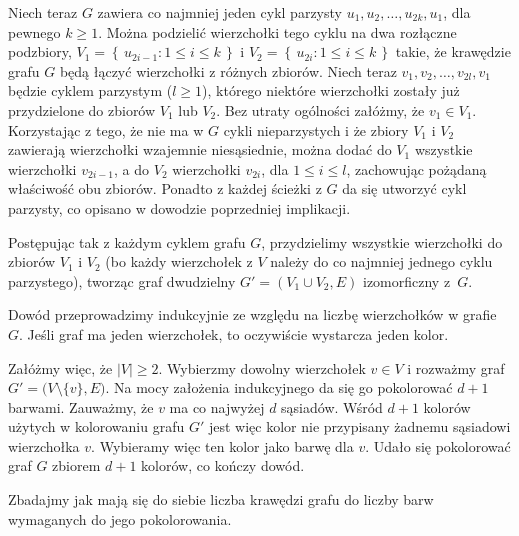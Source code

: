 Niech teraz $G$ zawiera co najmniej jeden cykl parzysty $u_1,u_2,\dots,u_{2k},u_1$, dla pewnego $k\ge1$. Można podzielić wierzchołki tego cyklu na dwa rozłączne podzbiory, $V_1=\left\{\,u_{2i-1}:1\le i\le k\,\right\}$ i $V_2=\left\{\,u_{2i}:1\le i\le k\,\right\}$ takie, że krawędzie grafu $G$ będą łączyć wierzchołki z różnych zbiorów. Niech teraz $v_1,v_2,\dots,v_{2l},v_1$ będzie cyklem parzystym ($l\ge1$), którego niektóre wierzchołki zostały już przydzielone do zbiorów $V_1$ lub $V_2$. Bez utraty ogólności załóżmy, że $v_1\in V_1$. Korzystając z tego, że nie ma w $G$ cykli nieparzystych i że zbiory $V_1$ i $V_2$ zawierają wierzchołki wzajemnie niesąsiednie, można dodać do $V_1$ wszystkie wierzchołki $v_{2i-1}$, a do $V_2$ wierzchołki $v_{2i}$, dla $1\le i\le l$, zachowując pożądaną właściwość obu zbiorów. Ponadto z każdej ścieżki z $G$ da się utworzyć cykl parzysty, co opisano w dowodzie poprzedniej implikacji.

Postępując tak z każdym cyklem grafu $G$, przydzielimy wszystkie wierzchołki do zbiorów $V_1$ i $V_2$ (bo każdy wierzchołek z $V$ należy do co najmniej jednego cyklu parzystego), tworząc graf dwudzielny $G'=(V_1\cup V_2,E)$ izomorficzny z~$G$.

\subexercise{} %
Dowód przeprowadzimy indukcyjnie ze względu na liczbę wierzchołków w grafie $G$. Jeśli graf ma jeden wierzchołek, to oczywiście wystarcza jeden kolor.

Załóżmy więc, że $|V|\ge2$. Wybierzmy dowolny wierzchołek $v\in V$ i rozważmy graf $G'=\bigl(V\setminus\{v\},E\bigr)$. Na mocy założenia indukcyjnego da się go pokolorować $d+1$ barwami. Zauważmy, że $v$ ma co najwyżej $d$ sąsiadów. Wśród $d+1$ kolorów użytych w kolorowaniu grafu $G'$ jest więc kolor nie przypisany żadnemu sąsiadowi wierzchołka $v$. Wybieramy więc ten kolor jako barwę dla $v$. Udało się pokolorować graf $G$ zbiorem $d+1$ kolorów, co kończy dowód.

\subexercise{} %
Zbadajmy jak mają się do siebie liczba krawędzi grafu do liczby barw wymaganych do jego pokolorowania.

